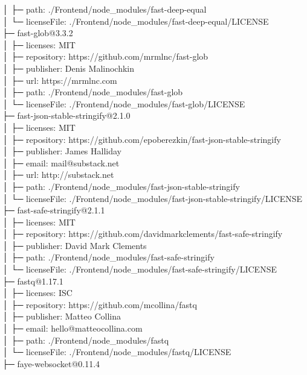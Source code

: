 │  ├─ path: ./Frontend/node\_modules/fast-deep-equal\\
│  └─ licenseFile: ./Frontend/node\_modules/fast-deep-equal/LICENSE\\
├─ fast-glob@3.3.2\\
│  ├─ licenses: MIT\\
│  ├─ repository: https://github.com/mrmlnc/fast-glob\\
│  ├─ publisher: Denis Malinochkin\\
│  ├─ url: https://mrmlnc.com\\
│  ├─ path: ./Frontend/node\_modules/fast-glob\\
│  └─ licenseFile: ./Frontend/node\_modules/fast-glob/LICENSE\\
├─ fast-json-stable-stringify@2.1.0\\
│  ├─ licenses: MIT\\
│  ├─ repository: https://github.com/epoberezkin/fast-json-stable-stringify\\
│  ├─ publisher: James Halliday\\
│  ├─ email: mail@substack.net\\
│  ├─ url: http://substack.net\\
│  ├─ path: ./Frontend/node\_modules/fast-json-stable-stringify\\
│  └─ licenseFile: ./Frontend/node\_modules/fast-json-stable-stringify/LICENSE\\
├─ fast-safe-stringify@2.1.1\\
│  ├─ licenses: MIT\\
│  ├─ repository: https://github.com/davidmarkclements/fast-safe-stringify\\
│  ├─ publisher: David Mark Clements\\
│  ├─ path: ./Frontend/node\_modules/fast-safe-stringify\\
│  └─ licenseFile: ./Frontend/node\_modules/fast-safe-stringify/LICENSE\\
├─ fastq@1.17.1\\
│  ├─ licenses: ISC\\
│  ├─ repository: https://github.com/mcollina/fastq\\
│  ├─ publisher: Matteo Collina\\
│  ├─ email: hello@matteocollina.com\\
│  ├─ path: ./Frontend/node\_modules/fastq\\
│  └─ licenseFile: ./Frontend/node\_modules/fastq/LICENSE\\
├─ faye-websocket@0.11.4\\
